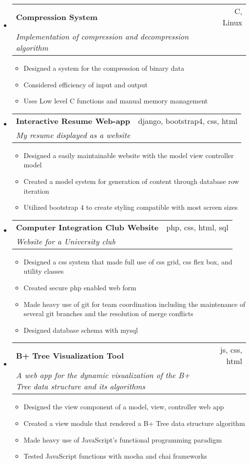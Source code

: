 \documentclass[letterpaper,11pt]{article}
\makeatletter
\newcommand{\resumeItem}[2]{
  \item\small{
    \textbf{#1}{ #2 \vspace{-2pt}}
  }
}
\newcommand{\resumeSubheading}[4]{
  \vspace{-1pt}\item
    \begin{tabular*}{0.97\textwidth}[t]{l@{\extracolsep{\fill}}r}
      \textbf{#1} & #2 \\
      \textit{\small#3} & \textit{\small #4} \\
    \end{tabular*}\vspace{-5pt}
}
\newcommand{\resumeSubItem}[2]{\resumeItem{#1}{#2}\vspace{-4pt}}
\newcommand{\resumeSubHeadingListStart}{\begin{itemize}[leftmargin=*]}
\newcommand{\resumeSubHeadingListEnd}{\end{itemize}}
\makeatother
\begin{document}
  \resumeSubHeadingListStart
    \resumeSubheading{Compression System}{C, Linux}{Implementation of compression and decompression algorithm}{}
    \resumeSubHeadingListStart
      \resumeSubItem{}{Designed a system for the compression of binary data}
      \resumeSubItem{}{Considered efficiency of input and output}
      \resumeSubItem{}{Uses Low level C functions and manual memory management}
    \resumeSubHeadingListEnd
  \resumeSubHeadingListEnd
  
  \resumeSubHeadingListStart
    \resumeSubheading{Interactive Resume Web-app}{django, bootstrap4, css, html}{My resume displayed as a website}{}
    \resumeSubHeadingListStart
      \resumeSubItem{}{Designed a easily maintainable website with the model view controller model}
      \resumeSubItem{}{Created a model system for generation of content through database row iteration}
      \resumeSubItem{}{Utilized bootstrap 4 to create styling compatible with most screen sizes}
    \resumeSubHeadingListEnd
  \resumeSubHeadingListEnd
  
  \resumeSubHeadingListStart
    \resumeSubheading{Computer Integration Club Website}{php, css, html, sql}{Website for a University club}{}
    \resumeSubHeadingListStart
      \resumeSubItem{}{Designed a css system that made full use of css grid, css flex box, and utility classes}
      \resumeSubItem{}{Created secure php enabled web form}
      \resumeSubItem{}{Made heavy use of git for team coordination including the maintenance of several git branches and the resolution of merge conflicts}
      \resumeSubItem{}{Designed database schema with mysql}
    \resumeSubHeadingListEnd
  \resumeSubHeadingListEnd
  
  
  \resumeSubHeadingListStart
    \resumeSubheading{B+ Tree Visualization Tool}{js, css, html}{A web app for the dynamic visualization of the B+ Tree data structure and its algorithms}{}
    \resumeSubHeadingListStart
      \resumeSubItem{}{Designed the view component of a model, view, controller web app}
      \resumeSubItem{}{Created a view module that rendered a B+ Tree data structure algorithm}
      \resumeSubItem{}{Made heavy use of JavaScript's functional programming paradigm}
      \resumeSubItem{}{Tested JavaScript functions with mocha and chai frameworks}
    \resumeSubHeadingListEnd
  \resumeSubHeadingListEnd
  
\end{document}
